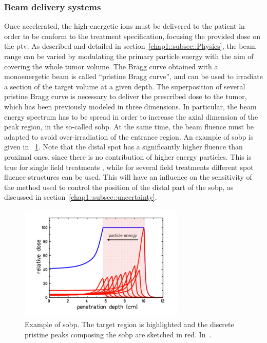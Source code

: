 \subsubsection{Beam delivery systems}\label{chap1::subsubsec::BeamDel}

Once accelerated, the high-energetic ions must be delivered to the patient in order to be conform to the treatment specification, focusing the provided dose on the \gls{ptv}. As described and detailed in section~\ref{chap1::subsec::Physics}, the beam range can be varied by modulating the primary particle energy with the aim of covering the whole tumor volume. The Bragg curve obtained with a monoenergetic beam is called \enquote{pristine Bragg curve}, and can be used to irradiate a section of the target volume at a given depth. The superposition of several pristine Bragg curve is necessary to deliver the prescribed dose to the tumor, which has been previously modeled in three dimensions. In particular, the beam energy spectrum has to be spread in order to increase the axial dimension of the peak region, in the so-called \gls{sobp}. At the same time, the beam fluence must be adapted to avoid over-irradiation of the entrance region. An example of \gls{sobp} is given in \figurename~\ref{chap1::fig::pristine_sobp}. Note that the distal spot has a significantly higher fluence than proximal ones, since there is no contribution of higher energy particles. This is true for single field treatments , while for several field treatments different spot fluence structures can be used. This will have an influence on the sensitivity of the method used to control the position of the distal part of the \gls{sobp}, as discussed in section~\ref{chap1::subsec::uncertainty}. 

\begin{figure}[!htbp]
\centering
\includegraphics[width=0.7\textwidth]{03_GraphicFiles/chapter1_Introduction/pristine_sobp.pdf}
\caption{Example of \gls{sobp}. The target region is highlighted and the discrete pristine peaks composing the \gls{sobp} are sketched in red. In~\cite{Durante2016}.}
\label{chap1::fig::pristine_sobp}
\end{figure} 

